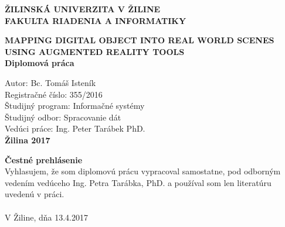 \documentclass[12pt, a4paper]{article}
\begin{document}

\begin{titlepage}
\begin{center}
        
        \vspace{1cm}
        \LARGE
        \textbf{ŽILINSKÁ UNIVERZITA V ŽILINE}\\
        \textbf{FAKULTA RIADENIA A INFORMATIKY}
        
        \vspace{4.5cm}
        
        \large
        \textbf{MAPPING DIGITAL OBJECT INTO REAL WORLD SCENES USING AUGMENTED REALITY TOOLS}\\
        \textbf{Diplomová práca}
        
        \vfill
        
        \large
        Autor: Bc. Tomáš Isteník\\
        Registračné číslo: 355/2016\\
        Študijný program: Informačné systémy\\
        Študijný odbor: Spracovanie dát\\
        Vedúci práce: Ing. Peter Tarábek PhD.\\
        \vspace{0.4cm}
        \textbf{Žilina 2017}\\
        \vspace{1.0cm}
        
    \end{center}
\end{titlepage}



\begin{titlepage}
  
  \vspace*{\fill}
        
  \textbf{Čestné prehlásenie}\\
  Vyhlasujem, že som diplomovú prácu vypracoval samostatne, pod odborným
vedením vedúceho Ing. Petra Tarábka, PhD. a používal som len literatúru uvedenú v práci.\\ \\
V Žiline, dňa 13.4.2017
  \vspace{1.0cm}
         
\end{titlepage}
\end{document}
